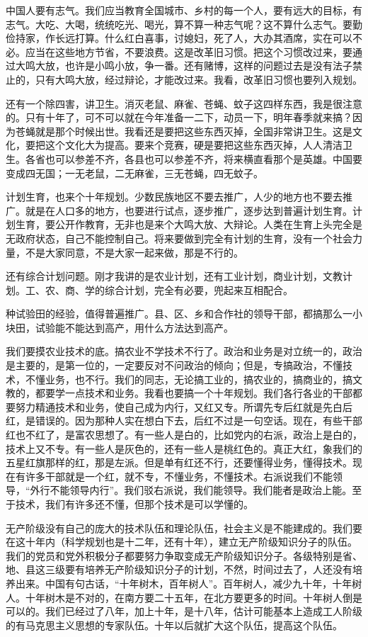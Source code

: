 中国人要有志气。我们应当教育全国城市、乡村的每一个人，要有远大的目标，有志气。大吃、大喝，统统吃光、喝光，算不算一种志气呢？这不算什么志气。要勤俭持家，作长远打算。什么红白喜事，讨媳妇，死了人，大办其酒席，实在可以不必。应当在这些地方节省，不要浪费。这是改革旧习惯。把这个习惯改过来，要通过大鸣大放，也许是小鸣小放，争一番。还有赌博，这样的问题过去是没有法子禁止的，只有大鸣大放，经过辩论，才能改过来。我看，改革旧习惯也要列入规划。

还有一个除四害，讲卫生。消灭老鼠、麻雀、苍蝇、蚊子这四样东西，我是很注意的。只有十年了，可不可以就在今年准备一二下，动员一下，明年春季就来搞？因为苍蝇就是那个时候出世。我看还是要把这些东西灭掉，全国非常讲卫生。这是文化，要把这个文化大为提高。要来个竞赛，硬是要把这些东西灭掉，人人清洁卫生。各省也可以参差不齐，各县也可以参差不齐，将来横直看那个是英雄。中国要变成四无国；一无老鼠，二无麻雀，三无苍蝇，四无蚊子。

计划生育，也来个十年规划。少数民族地区不要去推广，人少的地方也不要去推广。就是在人口多的地方，也要进行试点，逐步推广，逐步达到普遍计划生育。计划生育，要公开作教育，无非也是来个大鸣大放、大辩论。人类在生育上头完全是无政府状态，自己不能控制自己。将来要做到完全有计划的生育，没有一个社会力量，不是大家同意，不是大家一起来做，那是不行的。

还有综合计划问题。刚才我讲的是农业计划，还有工业计划，商业计划，文教计划。工、农、商、学的综合计划，完全有必要，兜起来互相配合。

种试验田的经验，值得普遍推广。县、区、乡和合作社的领导干部，都搞那么一小块田，试验能不能达到高产，用什么方法达到高产。

我们要摸农业技术的底。搞农业不学技术不行了。政治和业务是对立统一的，政治是主要的，是第一位的，一定要反对不问政治的倾向；但是，专搞政治，不懂技术，不懂业务，也不行。我们的同志，无论搞工业的，搞农业的，搞商业的，搞文教的，都要学一点技术和业务。我看也要搞一个十年规划。我们各行各业的干部都要努力精通技术和业务，使自己成为内行，又红又专。所谓先专后红就是先白后红，是错误的。因为那种人实在想白下去，后红不过是一句空话。现在，有些干部红也不红了，是富农思想了。有一些人是白的，比如党内的右派，政治上是白的，技术上又不专。有一些人是灰色的，还有一些人是桃红色的。真正大红，象我们的五星红旗那样的红，那是左派。但是单有红还不行，还要懂得业务，懂得技术。现在有许多干部就是一个红，就不专，不懂业务，不懂技术。右派说我们不能领导，“外行不能领导内行”。我们驳右派说，我们能领导。我们能者是政治上能。至于技术，我们有许多还不懂，但那个技术是可以学懂的。

无产阶级没有自己的庞大的技术队伍和理论队伍，社会主义是不能建成的。我们要在这十年内（科学规划也是十二年，还有十年），建立无产阶级知识分子的队伍。我们的党员和党外积极分子都要努力争取变成无产阶级知识分子。各级特别是省、地、县这三级要有培养无产阶级知识分子的计划，不然，时间过去了，人还没有培养出来。中国有句古话，“十年树木，百年树人”。百年树人，减少九十年，十年树人。十年树木是不对的，在南方要二十五年，在北方要更多的时间。十年树人倒是可以的。我们已经过了八年，加上十年，是十八年，估计可能基本上造成工人阶级的有马克思主义思想的专家队伍。十年以后就扩大这个队伍，提高这个队伍。

